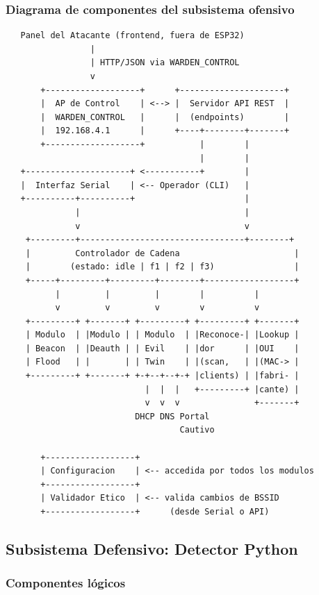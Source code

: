 \documentclass[11pt,a4paper]{article}
\begin{document}
\subsubsection{Diagrama de componentes del subsistema ofensivo}

\vspace{0.3cm}
\begin{verbatim}
   Panel del Atacante (frontend, fuera de ESP32)
                 |
                 | HTTP/JSON via WARDEN_CONTROL
                 v
       +-------------------+      +---------------------+
       |  AP de Control    | <--> |  Servidor API REST  |
       |  WARDEN_CONTROL   |      |  (endpoints)        |
       |  192.168.4.1      |      +----+--------+-------+
       +-------------------+           |        |
                                       |        |
   +---------------------+ <-----------+        |
   |  Interfaz Serial    | <-- Operador (CLI)   |
   +----------+----------+                      |
              |                                 |
              v                                 v
    +---------+---------------------------------+--------+
    |         Controlador de Cadena                       |
    |        (estado: idle | f1 | f2 | f3)                |
    +-----+---------+---------+--------+------------------+
          |         |         |        |          |
          v         v         v        v          v
    +---------+ +-------+ +---------+ +---------+ +-------+
    | Modulo  | |Modulo | | Modulo  | |Reconoce-| |Lookup |
    | Beacon  | |Deauth | | Evil    | |dor      | |OUI    |
    | Flood   | |       | | Twin    | |(scan,   | |(MAC-> |
    +---------+ +-------+ +-+--+--+-+ |clients) | |fabri- |
                            |  |  |   +---------+ |cante) |
                            v  v  v               +-------+
                          DHCP DNS Portal
                                   Cautivo

       +------------------+
       | Configuracion    | <-- accedida por todos los modulos
       +------------------+
       | Validador Etico  | <-- valida cambios de BSSID
       +------------------+      (desde Serial o API)
\end{verbatim}

\subsection{Subsistema Defensivo: Detector Python}

\subsubsection{Componentes lógicos}
\end{document}

